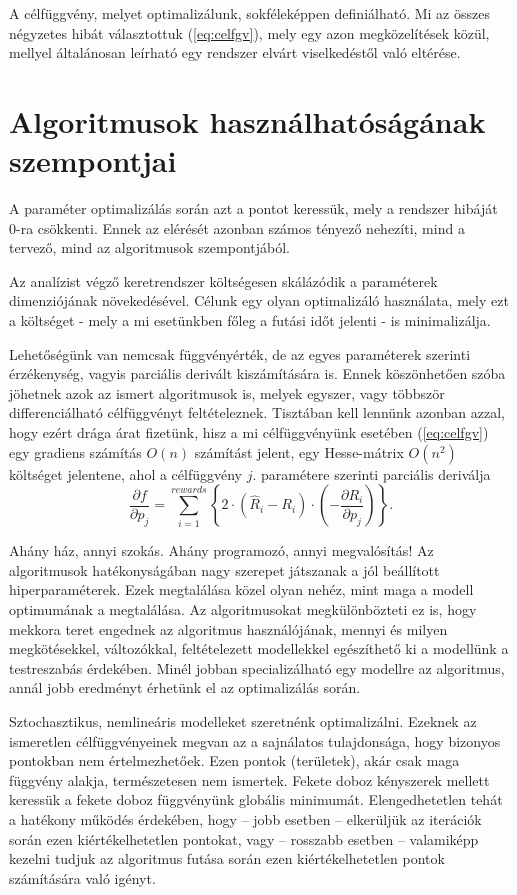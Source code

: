 A célfüggvény, melyet optimalizálunk, sokféleképpen definiálható. Mi az összes négyzetes hibát választottuk (\ref{eq:celfgv}), mely egy azon megközelítések közül, mellyel általánosan leírható egy rendszer elvárt viselkedéstől való eltérése.

\section{Algoritmusok használhatóságának szempontjai}

A paraméter optimalizálás során azt a pontot keressük, mely a rendszer hibáját 0-ra csökkenti. Ennek az elérését azonban számos tényező nehezíti, mind a tervező, mind az algoritmusok szempontjából.

Az analízist végző keretrendszer költségesen skálázódik a paraméterek dimenziójának növekedésével. Célunk egy olyan optimalizáló használata, mely ezt a költséget - mely a mi esetünkben főleg a futási időt jelenti - is minimalizálja.

Lehetőségünk van nemcsak függvényérték, de az egyes paraméterek szerinti érzékenység, vagyis parciális derivált kiszámítására is. Ennek köszönhetően szóba jöhetnek azok az ismert algoritmusok is, melyek egyszer, vagy többször differenciálható célfüggvényt feltételeznek. Tisztában kell lennünk azonban azzal, hogy ezért drága árat fizetünk, hisz a mi célfüggvényünk esetében (\ref{eq:celfgv}) egy gradiens számítás $O(n)$ számítást jelent, egy Hesse-mátrix $O(n^2)$ költséget jelentene, ahol a célfüggvény $j.$ paramétere szerinti parciális deriválja
$$\frac{\partial f}{\partial p_j}=\sum_{i=1}^{rewards}\left\lbrace   2\cdot \left( \hat{R}_i-R_i\right) \cdot\left(-\frac{\partial R_i}{\partial p_j}\right)  \right\rbrace   .$$



Ahány ház, annyi szokás. Ahány programozó, annyi megvalósítás! Az algoritmusok hatékonyságában nagy szerepet játszanak a jól beállított hiperparaméterek. Ezek megtalálása közel olyan nehéz, mint maga a modell optimumának a megtalálása. Az algoritmusokat megkülönbözteti ez is, hogy mekkora teret engednek az algoritmus használójának, mennyi és milyen megkötésekkel, változókkal, feltételezett modellekkel egészíthető ki a modellünk a testreszabás érdekében. Minél jobban specializálható egy modellre az algoritmus, annál jobb eredményt érhetünk el az optimalizálás során.

Sztochasztikus, nemlineáris modelleket szeretnénk optimalizálni. Ezeknek az ismeretlen célfüggvényeinek megvan az a sajnálatos tulajdonsága, hogy bizonyos pontokban nem értelmezhetőek. Ezen pontok (területek), akár csak maga függvény alakja, természetesen nem ismertek. Fekete doboz kényszerek mellett keressük a fekete doboz függvényünk globális minimumát. %
Elengedhetetlen tehát a hatékony működés érdekében, hogy -- jobb esetben -- elkerüljük az iterációk során ezen kiértékelhetetlen pontokat, vagy -- rosszabb esetben -- valamiképp kezelni tudjuk az algoritmus futása során ezen kiértékelhetetlen pontok számítására való igényt.

